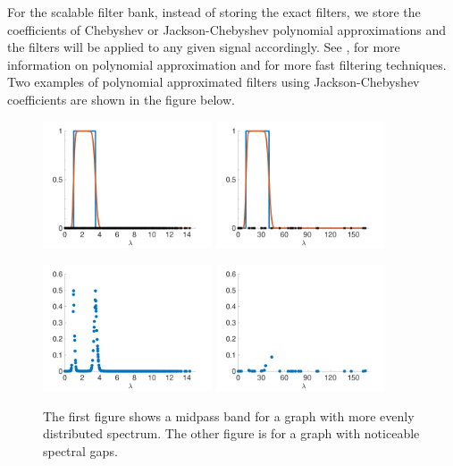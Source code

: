 \documentclass[a4paper]{article}
\theoremstyle{definition}
\begin{document}
For the scalable filter bank, instead of storing the exact filters, we store the coefficients of Chebyshev or Jackson-Chebyshev polynomial approximations and the filters will be applied to any given signal accordingly. See \cite{shuman2013spectrum}, \cite{Druskin and Knizhnerman} for more information on polynomial approximation and \cite{fast filtering} for more fast filtering techniques. Two examples of polynomial approximated filters using Jackson-Chebyshev coefficients are shown in the figure below.
 
 \begin{figure}[h]
 \centering
 \includegraphics[width = 5cm]{fig_approx_filter_sensor.pdf}
 \includegraphics[width = 5cm]{fig_approx_filter_net25.pdf}
  
  \includegraphics[width = 5cm]{fig_approx_filter_error_sensor.pdf}
  \includegraphics[width = 5cm]{fig_approx_filter_error_net25.pdf} 
  
 
 \caption{The first figure shows a midpass band for a graph with more evenly distributed spectrum. The other figure is for a graph with noticeable spectral gaps.}
 \end{figure}
\end{document}
